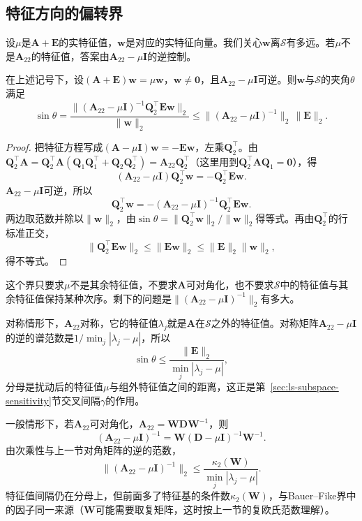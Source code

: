 \subsection{特征方向的偏转界}
设$\mu$是$\bm A+\bm E$的实特征值，$\bm w$是对应的实特征向量。我们关心$\bm w$离$\mathcal S$有多远。若$\mu$不是$\bm A_{22}$的特征值，答案由$\bm A_{22}-\mu\bm I$的逆控制。
\begin{theorem}[特征方向偏离不变子空间的界]
\label{thm:ls-invariant-subspace-deflection}
在上述记号下，设$(\bm A+\bm E)\bm w=\mu\bm w$，$\bm w\neq\bm0$，且$\bm A_{22}-\mu\bm I$可逆。则$\bm w$与$\mathcal S$的夹角$\theta$满足
\begin{equation}
 \sin\theta
 =\frac{\lVert(\bm A_{22}-\mu\bm I)^{-1}\bm Q_2^\top\bm E\bm w\rVert_2}{\lVert\bm w\rVert_2}
 \leq\lVert(\bm A_{22}-\mu\bm I)^{-1}\rVert_2\,\lVert\bm E\rVert_2 .
 \label{eq:ls-invariant-subspace-deflection}
\end{equation}
\end{theorem}
\begin{proof}
把特征方程写成$(\bm A-\mu\bm I)\bm w=-\bm E\bm w$，左乘$\bm Q_2^\top$。由$\bm Q_2^\top\bm A=\bm Q_2^\top\bm A(\bm Q_1\bm Q_1^\top+\bm Q_2\bm Q_2^\top)=\bm A_{22}\bm Q_2^\top$（这里用到$\bm Q_2^\top\bm A\bm Q_1=\bm0$），得
\[
 (\bm A_{22}-\mu\bm I)\bm Q_2^\top\bm w=-\bm Q_2^\top\bm E\bm w .
\]
$\bm A_{22}-\mu\bm I$可逆，所以
\[
 \bm Q_2^\top\bm w=-(\bm A_{22}-\mu\bm I)^{-1}\bm Q_2^\top\bm E\bm w .
\]
两边取范数并除以$\lVert\bm w\rVert_2$，由$\sin\theta=\lVert\bm Q_2^\top\bm w\rVert_2/\lVert\bm w\rVert_2$得等式。再由$\bm Q_2^\top$的行标准正交，
\[
 \lVert\bm Q_2^\top\bm E\bm w\rVert_2\leq\lVert\bm E\bm w\rVert_2\leq\lVert\bm E\rVert_2\lVert\bm w\rVert_2 ,
\]
得不等式。
\end{proof}

这个界只要求$\mu$不是其余特征值，不要求$\bm A$可对角化，也不要求$\mathcal S$中的特征值与其余特征值保持某种次序。剩下的问题是$\lVert(\bm A_{22}-\mu\bm I)^{-1}\rVert_2$有多大。

对称情形下，$\bm A_{22}$对称，它的特征值$\lambda_j$就是$\bm A$在$\mathcal S$之外的特征值。对称矩阵$\bm A_{22}-\mu\bm I$的逆的谱范数是$1/\min_j|\lambda_j-\mu|$，所以
\[
 \sin\theta\leq\frac{\lVert\bm E\rVert_2}{\min_j|\lambda_j-\mu|},
\]
分母是扰动后的特征值$\mu$与组外特征值之间的距离，这正是第~\ref{sec:ls-subspace-sensitivity}节交叉间隔$\gamma$的作用。

一般情形下，若$\bm A_{22}$可对角化，$\bm A_{22}=\bm W\bm D\bm W^{-1}$，则
\[
 (\bm A_{22}-\mu\bm I)^{-1}=\bm W(\bm D-\mu\bm I)^{-1}\bm W^{-1} .
\]
由次乘性与上一节对角矩阵的逆的范数，
\[
 \lVert(\bm A_{22}-\mu\bm I)^{-1}\rVert_2\leq\frac{\kappa_2(\bm W)}{\min_j|\lambda_j-\mu|}.
\]
特征值间隔仍在分母上，但前面多了特征基的条件数$\kappa_2(\bm W)$，与Bauer--Fike界中的因子同一来源（$\bm W$可能需要取复矩阵，这时按上一节的复欧氏范数理解）。

